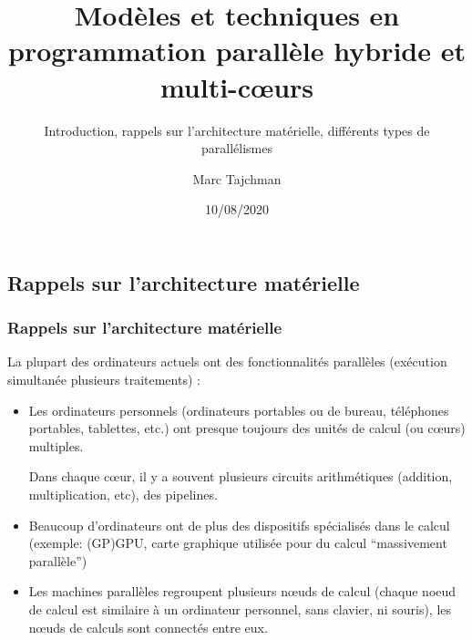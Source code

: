\documentclass{beamer}
\title{Modèles et techniques en programmation parallèle hybride et multi-c\oe urs}
\subtitle{Introduction, rappels sur l'architecture matérielle, différents types de parallélismes}
\author{Marc Tajchman}\institute{CEA - DEN/DM2S/STMF/LMES}
\date{10/08/2020}
\begin{document}
\begin{frame}
\titlepage
\end{frame}

\large
\begin{frame}
\section{Rappels sur l'architecture mat\'erielle}
\frametitle{Rappels sur l'architecture mat\'erielle}

La plupart des ordinateurs actuels ont des fonctionnalités parallèles  (exécution simultanée plusieurs traitements) : 

\begin{itemize}
	\item Les ordinateurs personnels (ordinateurs portables ou de bureau, téléphones portables, tablettes, etc.) ont presque toujours des unités de calcul (ou cœurs) multiples.
	
	Dans chaque cœur, il y a souvent plusieurs circuits arithmétiques (addition, multiplication, etc), des pipelines.
	
	\item Beaucoup d'ordinateurs ont de plus des dispositifs spécialisés dans le calcul (exemple: (GP)GPU, carte graphique utilisée pour du calcul ``massivement parallèle'')
	
	\item Les machines parallèles regroupent plusieurs nœuds de calcul (chaque noeud de calcul est similaire à un ordinateur personnel, sans clavier, ni souris), les nœuds de calculs sont connectés entre eux.
\end{itemize}
\end{frame}
\end{document}
